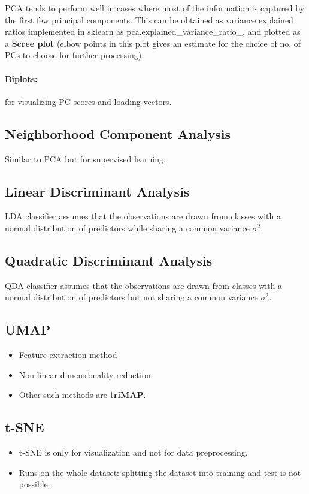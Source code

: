 \documentclass[a4paper, 12pt]{report}
\begin{document}
PCA tends to perform well in cases where most of the information is captured by the first few principal components. This can be obtained as variance explained ratios implemented in sklearn as pca.explained\_variance\_ratio\_, and plotted as a \textbf{Scree plot} (elbow points in this plot gives an estimate for the choice of no. of PCs to choose for further processing).

\paragraph{Biplots:}for visualizing PC scores and loading vectors.

\subsection{Neighborhood Component Analysis}
Similar to PCA but for supervised learning.

\subsection{Linear Discriminant Analysis}
LDA classifier assumes that the observations are drawn from classes with a normal distribution of predictors while sharing a common variance $\sigma^2$.


\subsection{Quadratic Discriminant Analysis}
QDA classifier assumes that the observations are drawn from classes with a normal distribution of predictors but not sharing a common variance $\sigma^2$.


\subsection{UMAP}
\begin{itemize}
\item Feature extraction method
\item Non-linear dimensionality reduction
\item Other such methods are \textbf{triMAP}.
\end{itemize}

\subsection{t-SNE}
\begin{itemize}
\item t-SNE is only for visualization and not for data preprocessing.
\item Runs on the whole dataset: splitting the dataset into training and test is not possible.
\end{itemize}
\end{document}
